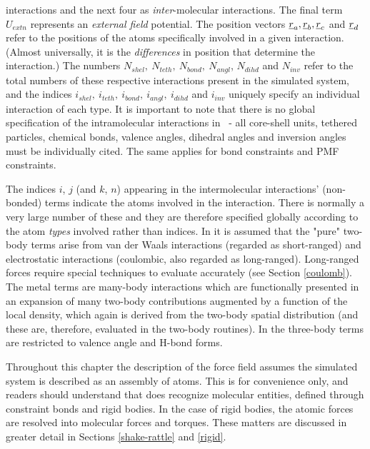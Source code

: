 interactions and the next four as {\em inter}-molecular
interactions.  The final term $U_{extn}$ represents an {\em
external field} potential.
The position vectors $\mbox{$\underline{r}$}_{a},\mbox{$\underline{r}$}_{b},\mbox{$\underline{r}$}_{c}$ and $\mbox{$\underline{r}$}_{d}$
refer to the positions of the atoms specifically involved in a given
interaction. (Almost universally, it is the {\em differences} in
position that determine the interaction.)  The numbers
$N_{shel},~N_{teth},~N_{bond},~N_{angl}$, $N_{dihd}$ and $N_{inv}$
refer to the total numbers of these respective interactions present
in the simulated system, and the indices
$i_{shel},~i_{teth},~i_{bond},~i_{angl},~i_{dihd}$ and $i_{inv}$
uniquely specify an individual interaction of each type.  It is
important to note that there is no global specification of the
intramolecular interactions in \D~- all core-shell units, tethered
particles, chemical bonds, valence angles, dihedral angles and
inversion angles must be individually cited.  The same applies for
bond constraints and PMF
constraints.

The indices $i$, $j$ (and $k$, $n$) appearing in the intermolecular
interactions' (non-bonded) terms
indicate the atoms involved in the interaction.
There is normally a very large number of these and they are
therefore specified globally according to the atom {\em types}
involved rather than indices.  In \D it is assumed that the "pure"
two-body terms arise from van der Waals interactions (regarded as short-ranged) and electrostatic
interactions (coulombic, also regarded as
long-ranged).  Long-ranged forces
require special techniques to evaluate accurately (see Section
\ref{coulomb}).  The metal terms are
many-body interactions which are functionally presented in an expansion of
many two-body contributions augmented by a function of the local density,
which again is derived from the two-body spatial distribution
(and these are, therefore, evaluated in the two-body
routines).  In \D the three-body terms
are restricted to valence angle and
H-bond forms.

Throughout this chapter the description of the force
field assumes the simulated system is described
as an assembly of atoms.  This is for convenience only, and
readers should understand that \D does recognize molecular
entities, defined through constraint bonds
and rigid bodies.  In the case of rigid bodies, the atomic forces
are resolved into molecular forces and torques.  These matters are
discussed in greater detail in Sections \ref{shake-rattle} and \ref{rigid}.


